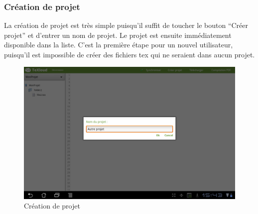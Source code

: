 \documentclass[a4paper,12pt]{article}
\begin{document}
\newpage
\subsubsection{Création de projet}
\bigskip
La création de projet est très simple puisqu'il suffit de toucher le bouton ``Créer projet'' et d'entrer un nom de projet. Le projet est ensuite immédiatement disponible dans la liste. C'est la première étape pour un nouvel utilisateur, puisqu'il est impossible 
de créer des fichiers tex qui ne seraient dans aucun projet.

\begin{figure}[!ht]
\begin{center}
  \includegraphics[width=1\textwidth]{./images/screenshot/creation_projet.png}
\end{center}
  \caption{Création de projet}
  \label{Création de projet}
\end{figure}
\paragraph*{}

\newpage
\end{document}
